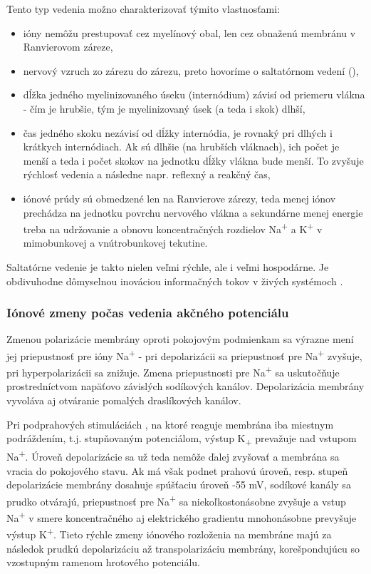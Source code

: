 Tento typ vedenia možno charakterizovať týmito vlastnosťami:
\begin{itemize}
  \item ióny nemôžu prestupovať cez myelínový obal, len cez obnaženú membránu v Ranvierovom záreze,
  \item nervový vzruch  zo zárezu do zárezu, preto hovoríme o saltatórnom vedení (),
  \item dĺžka jedného myelinizovaného úseku (internódium) závisí od priemeru vlákna - čím je hrubšie, tým je myelinizovaný úsek (a teda i skok) dlhší,
  \item čas jedného skoku nezávisí od dĺžky internódia, je rovnaký pri dlhých i krátkych internódiach. Ak sú dlhšie (na hrubších vláknach), ich počet je menší a teda i počet skokov na jednotku dĺžky vlákna bude menší. To zvyšuje rýchlosť vedenia a následne napr. reflexný a reakčný čas,
  \item iónové prúdy sú obmedzené len na Ranvierove zárezy, teda menej iónov prechádza na jednotku povrchu nervového vlákna a sekundárne menej energie treba na udržovanie a obnovu koncentračných rozdielov Na\textsuperscript{+} a K\textsuperscript{+} v mimobunkovej a vnútrobunkovej tekutine.
\end{itemize}

Saltatórne vedenie je takto nielen veľmi rýchle, ale i veľmi hospodárne. Je obdivuhodne dômyselnou inováciou informačných tokov v živých systémoch \cite{bederFyziologiaCloveka2005}.

\subsubsection{Iónové zmeny počas vedenia akčného potenciálu}

Zmenou polarizácie membrány oproti pokojovým podmienkam sa výrazne mení jej priepustnosť pre ióny Na\textsuperscript{+} - pri depolarizácii sa priepustnosť pre Na\textsuperscript{+} zvyšuje, 
pri hyperpolarizácii sa znižuje. Zmena priepustnosti pre Na\textsuperscript{+} sa uskutočňuje prostredníctvom napäťovo závislých sodíkových kanálov. Depolarizácia membrány vyvoláva aj 
otváranie pomalých draslíkových kanálov. 

Pri podprahových stimuláciách , na ktoré reaguje membrána iba miestnym podráždením, t.j. stupňovaným potenciálom, výstup K\textsubscript{+} prevažuje nad vstupom Na\textsuperscript{+}. 
Úroveň depolarizácie sa už teda nemôže ďalej zvyšovať a membrána sa vracia do pokojového stavu. Ak má však podnet prahovú úroveň, resp. stupeň depolarizácie membrány dosahuje spúšťaciu úroveň
-55 mV, sodíkové kanály sa prudko otvárajú, priepustnosť pre Na\textsuperscript{+} sa niekoľkostonásobne zvyšuje a vstup Na\textsuperscript{+} v smere koncentračného aj elektrického gradientu
mnohonásobne prevyšuje výstup K\textsuperscript{+}. Tieto rýchle zmeny iónového rozloženia na membráne majú za následok prudkú depolarizáciu až transpolarizáciu membrány, korešpondujúcu so vzostupným
ramenom hrotového potenciálu.

